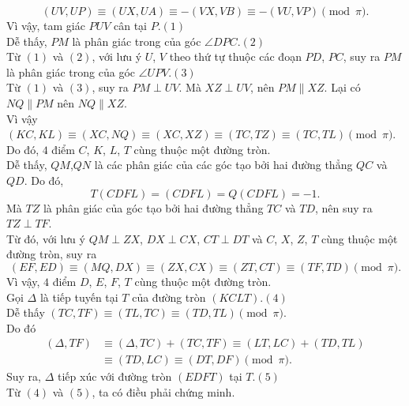 \begin{bt}
{$$(UV,UP)\equiv (UX,UA)\equiv -(VX,VB)\equiv -(VU,VP) \pmod\pi.$$
Vì vậy, tam giác $PUV$ cân tại $P$.\hfill $(1)$\\
Dễ thấy, $PM$ là phân giác trong của góc $\angle DPC$.\hfill $(2)$\\
Từ $(1)$ và $(2)$, với lưu ý $U$, $V$ theo thứ tự thuộc các đoạn $PD$, $PC$, suy ra $PM$ là phân giác trong của góc $\angle UPV$.\hfill $(3)$\\
Từ $(1)$ và $(3)$, suy ra $PM\perp UV$. Mà $XZ\perp UV$, nên $PM\parallel XZ$. Lại có $NQ\parallel PM$ nên $NQ\parallel XZ$.\\
Vì vậy $(KC,KL)\equiv (XC,NQ)\equiv (XC,XZ)\equiv (TC,TZ)\equiv (TC,TL) \pmod\pi$.\\
Do đó, $4$ điểm $C$, $K$, $L$, $T$ cùng thuộc một đường tròn.\\
Dễ thấy, $QM$,$QN$ là các phân giác của các góc tạo bởi hai đường thẳng $QC$ và $QD$. Do đó,
$$T(CDFL)=(CDFL)=Q(CDFL)=-1.$$
Mà $TZ$ là phân giác của góc tạo bởi hai đường thẳng $TC$ và $TD$, nên suy ra $TZ\perp TF$.\\
Từ đó, với lưu ý $QM\perp ZX$, $DX\perp CX$, $CT\perp DT$ và $C$, $X$, $Z$, $T$ cùng thuộc một đường tròn, suy ra
$$(EF,ED)\equiv (MQ,DX)\equiv (ZX,CX)\equiv (ZT,CT)\equiv (TF,TD) \pmod\pi.$$
Vì vậy, $4$ điểm $D$, $E$, $F$, $T$ cùng thuộc một đường tròn.\\
Gọi $\Delta$ là tiếp tuyến tại $T$ của đường tròn $(KCLT)$.\hfill $(4)$\\
Dễ thấy $(TC,TF)\equiv (TL,TC)\equiv (TD,TL) \pmod\pi$.\\
Do đó
\begin{align*}
(\Delta,TF)&\equiv (\Delta,TC)+(TC,TF)\equiv (LT,LC)+(TD,TL)\\
&\equiv (TD,LC)\equiv (DT,DF) \pmod\pi.
\end{align*}
Suy ra, $\Delta$ tiếp xúc với đường tròn $(EDFT)$ tại $T$.\hfill $(5)$\\
Từ $(4)$ và $(5)$, ta có điều phải chứng minh.
}
\end{bt}

